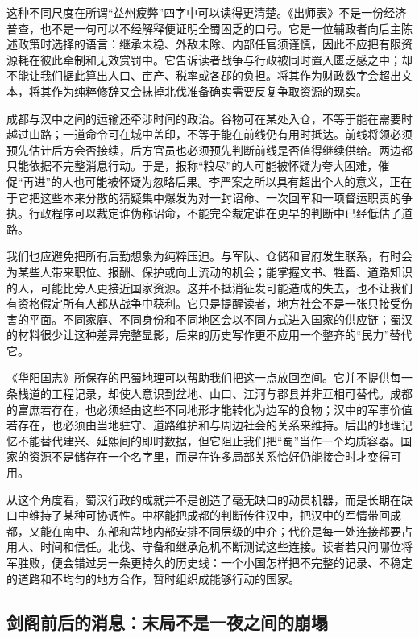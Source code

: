 这种不同尺度在所谓“益州疲弊”四字中可以读得更清楚。《出师表》不是一份经济普查，也不是一句可以不经解释便证明全蜀困乏的口号。它是一位辅政者向后主陈述政策时选择的语言：继承未稳、外敌未除、内部任官须谨慎，因此不应把有限资源耗在彼此牵制和无效赏罚中。它告诉读者战争与行政被同时置入匮乏感之中；却不能让我们据此算出人口、亩产、税率或各郡的负担。将其作为财政数字会超出文本，将其作为纯粹修辞又会抹掉北伐准备确实需要反复争取资源的现实。

成都与汉中之间的运输还牵涉时间的政治。谷物可在某处入仓，不等于能在需要时越过山路；一道命令可在城中盖印，不等于能在前线仍有用时抵达。前线将领必须预先估计后方会否接续，后方官员也必须预先判断前线是否值得继续供给。两边都只能依据不完整消息行动。于是，报称“粮尽”的人可能被怀疑为夸大困难，催促“再进”的人也可能被怀疑为忽略后果。李严案之所以具有超出个人的意义，正在于它把这些本来分散的猜疑集中爆发为对一封诏命、一次回军和一项督运职责的争执。行政程序可以裁定谁伪称诏命，不能完全裁定谁在更早的判断中已经低估了道路。

我们也应避免把所有后勤想象为纯粹压迫。与军队、仓储和官府发生联系，有时会为某些人带来职位、报酬、保护或向上流动的机会；能掌握文书、牲畜、道路知识的人，可能比旁人更接近国家资源。这并不抵消征发可能造成的失去，也不让我们有资格假定所有人都从战争中获利。它只是提醒读者，地方社会不是一张只接受伤害的平面。不同家庭、不同身份和不同地区会以不同方式进入国家的供应链；蜀汉的材料很少让这种差异完整显影，后来的历史写作更不应用一个整齐的“民力”替代它。

《华阳国志》所保存的巴蜀地理可以帮助我们把这一点放回空间。它并不提供每一条栈道的工程记录，却使人意识到盆地、山口、江河与郡县并非互相可替代。成都的富庶若存在，也必须经由这些不同地形才能转化为边军的食物；汉中的军事价值若存在，也必须由当地驻守、道路维护和与周边社会的关系来维持。后出的地理记忆不能替代建兴、延熙间的即时数据，但它阻止我们把“蜀”当作一个均质容器。国家的资源不是储存在一个名字里，而是在许多局部关系恰好仍能接合时才变得可用。

从这个角度看，蜀汉行政的成就并不是创造了毫无缺口的动员机器，而是长期在缺口中维持了某种可协调性。中枢能把成都的判断传往汉中，把汉中的军情带回成都，又能在南中、东部和盆地内部安排不同层级的中介；代价是每一处连接都要占用人、时间和信任。北伐、守备和继承危机不断测试这些连接。读者若只问哪位将军胜败，便会错过另一条更持久的历史线：一个小国怎样把不完整的记录、不稳定的道路和不均匀的地方合作，暂时组织成能够行动的国家。

\subsection{剑阁前后的消息：末局不是一夜之间的崩塌}


